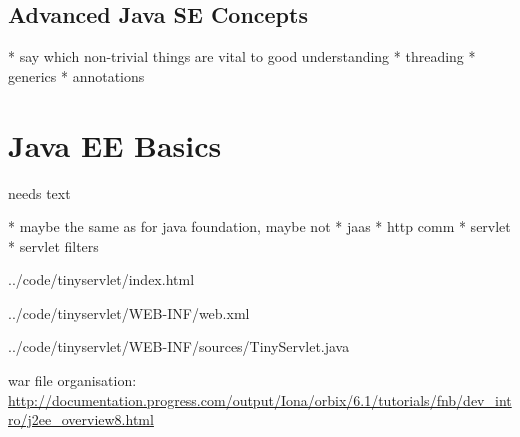 \documentclass[a4paper,10pt,twoside]{book}
\begin{document}
\subsection{Advanced Java SE Concepts}

  * say which non-trivial things are vital to good understanding
  * threading
  * generics
  * annotations

\section{Java EE Basics}


needs text

  * maybe the same as for java foundation, maybe not
  * jaas
  * http comm
  * servlet
  * servlet filters



{../code/tinyservlet/index.html}


{../code/tinyservlet/WEB-INF/web.xml}


{../code/tinyservlet/WEB-INF/sources/TinyServlet.java}

war file organisation: \url{http://documentation.progress.com/output/Iona/orbix/6.1/tutorials/fnb/dev_intro/j2ee_overview8.html}


\ifx\wholebook\relax\else
   
   
\end{document}
